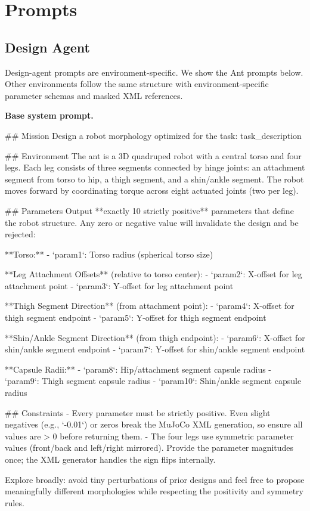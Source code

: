 \section{Prompts}
\label{app:prompts}
\newcommand{\promptheading}[1]{\vspace{0.4em}\noindent\textbf{#1}\par}
\subsection{Design Agent}
\label{app:design_prompts}
Design-agent prompts are environment-specific. We show the Ant prompts below. Other environments follow the same structure with environment-specific parameter schemas and masked XML references.

\promptheading{Base system prompt.}
\begin{promptbox}
## Mission
Design a robot morphology optimized for the task: {task_description}

## Environment
The ant is a 3D quadruped robot with a central torso and four legs. Each leg consists of three segments connected by hinge joints: an attachment segment from torso to hip, a thigh segment, and a shin/ankle segment. The robot moves forward by coordinating torque across eight actuated joints (two per leg).

## Parameters
Output **exactly 10 strictly positive** parameters that define the robot structure. Any zero or negative value will invalidate the design and be rejected:

**Torso:**
- `param1`: Torso radius (spherical torso size)

**Leg Attachment Offsets** (relative to torso center):
- `param2`: X-offset for leg attachment point
- `param3`: Y-offset for leg attachment point

**Thigh Segment Direction** (from attachment point):
- `param4`: X-offset for thigh segment endpoint
- `param5`: Y-offset for thigh segment endpoint

**Shin/Ankle Segment Direction** (from thigh endpoint):
- `param6`: X-offset for shin/ankle segment endpoint
- `param7`: Y-offset for shin/ankle segment endpoint

**Capsule Radii:**
- `param8`: Hip/attachment segment capsule radius
- `param9`: Thigh segment capsule radius
- `param10`: Shin/ankle segment capsule radius

## Constraints
- Every parameter must be strictly positive. Even slight negatives (e.g., `-0.01`) or zeros break the MuJoCo XML generation, so ensure all values are > 0 before returning them.
- The four legs use symmetric parameter values (front/back and left/right mirrored). Provide the parameter magnitudes once; the XML generator handles the sign flips internally.

Explore broadly: avoid tiny perturbations of prior designs and feel free to propose meaningfully different morphologies while respecting the positivity and symmetry rules.
\end{promptbox}

